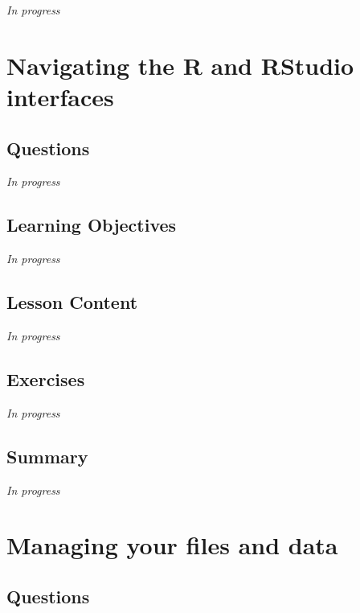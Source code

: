 \documentclass[
  letterpaper,
  DIV=11,
  numbers=noendperiod]{scrreprt}
\begin{document}
\emph{In progress}


\hypertarget{sec-navigating}{%
\chapter{Navigating the R and RStudio interfaces}\label{sec-navigating}}

\hypertarget{questions-2}{%
\section{Questions}\label{questions-2}}

\emph{In progress}

\hypertarget{learning-objectives-2}{%
\section{Learning Objectives}\label{learning-objectives-2}}

\emph{In progress}

\hypertarget{lesson-content-2}{%
\section{Lesson Content}\label{lesson-content-2}}

\emph{In progress}

\hypertarget{exercises-2}{%
\section{Exercises}\label{exercises-2}}

\emph{In progress}

\hypertarget{summary-3}{%
\section{Summary}\label{summary-3}}

\emph{In progress}


\hypertarget{sec-managing}{%
\chapter{Managing your files and data}\label{sec-managing}}

\hypertarget{questions-3}{%
\section{Questions}\label{questions-3}}
\end{document}
